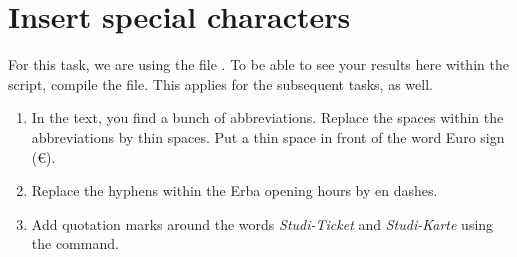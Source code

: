 \section{Insert special characters}

For this task, we are using the file .
To be able to see your results here within the script,
compile the  file.
This applies for the subsequent tasks, as well.

\begin{enumerate}
	\item In the text, you find a bunch of abbreviations. Replace the spaces 
	within the abbreviations by thin spaces. Put a thin space in front of the 
	word Euro sign (€).
	\item Replace the hyphens within the Erba opening hours by en dashes.
	\item Add quotation marks around the words \emph{Studi-Ticket} and 
	\emph{Studi-Karte} using the  command. 
\end{enumerate}


